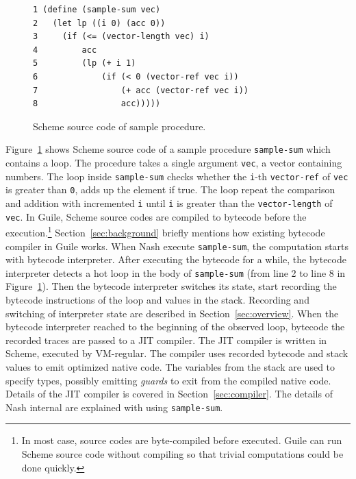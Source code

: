 \documentclass[preprint]{sigplanconf}
\begin{document}
\begin{figure}
  \begin{center}
\begin{verbatim}
1 (define (sample-sum vec)
2   (let lp ((i 0) (acc 0))
3     (if (<= (vector-length vec) i)
4         acc
5         (lp (+ i 1)
6             (if (< 0 (vector-ref vec i))
7                 (+ acc (vector-ref vec i))
8                 acc)))))
\end{verbatim}
\end{center}
\caption{Scheme source code of sample procedure.}
\label{fig:scmloop}
\end{figure}

Figure~\hyperref[fig:scmloop]{\ref{fig:scmloop}} shows Scheme source code of a
sample procedure \texttt{sample-sum} which contains a loop. The procedure
takes a single argument \texttt{vec}, a vector containing numbers. The loop
inside \texttt{sample-sum} checks whether the \texttt{i}-th
\texttt{vector-ref} of \texttt{vec} is greater than \texttt{0}, adds up the
element if true. The loop repeat the comparison and addition with incremented
\texttt{i} until \texttt{i} is greater than the \texttt{vector-length} of
\texttt{vec}. In Guile, Scheme source codes are compiled to bytecode before
the execution.\footnote{In most case, source codes are byte-compiled before
  executed. Guile can run Scheme source code without compiling so that trivial
  computations could be done quickly.}
Section~\hyperref[sec:background]{\ref{sec:background}} briefly mentions how
existing bytecode compiler in Guile works. When Nash execute
\texttt{sample-sum}, the computation starts with bytecode interpreter. After
executing the bytecode for a while, the bytecode interpreter detects a hot
loop in the body of \texttt{sample-sum} (from line 2 to line 8 in
Figure~\hyperref[fig:scmloop]{\ref{fig:scmloop}}). Then the bytecode
interpreter switches its state, start recording the bytecode instructions of
the loop and values in the stack. Recording and switching of interpreter state
are described in Section~\hyperref[sec:overview]{\ref{sec:overview}}. When the
bytecode interpreter reached to the beginning of the observed loop, bytecode
the recorded traces are passed to a JIT compiler. The JIT compiler is written
in Scheme, executed by VM-regular. The compiler uses recorded bytecode and
stack values to emit optimized native code. The variables from the stack are
used to specify types, possibly emitting \textit{guards} to exit from the
compiled native code. Details of the JIT compiler is covered in
Section~\hyperref[sec:compiler]{\ref{sec:compiler}}. The details of Nash
internal are explained with using \texttt{sample-sum}.
\end{document}
